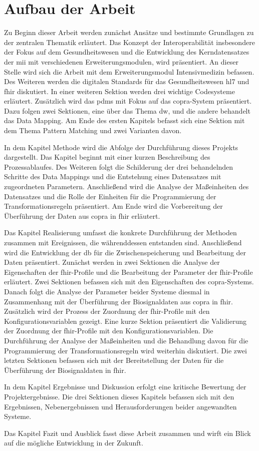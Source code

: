 \section{Aufbau der Arbeit} \label{sec:structure}

Zu Beginn dieser Arbeit werden zunächst Ansätze und bestimmte Grundlagen zu der zentralen Thematik erläutert. Das Konzept der Interoperabilität insbesondere der Fokus auf dem Gesundheitswesen und die Entwicklung des Kerndatensatzes der \ac{mii} mit verschiedenen Erweiterungsmodulen, wird präsentiert. An dieser Stelle wird sich die Arbeit mit dem Erweiterungsmodul Intensivmedizin befassen. Des Weiteren werden die digitalen Standards für das Gesundheitswesen \ac{hl7} und \ac{fhir} diskutiert. In einer weiteren Sektion werden drei wichtige Codesysteme erläutert. Zusätzlich wird das \ac{pdms} mit Fokus auf das \ac{copra}-System präsentiert. Dazu folgen zwei Sektionen, eine über das Thema \ac{dw}, und die andere behandelt das Data Mapping. Am Ende des ersten Kapitels befasst sich eine Sektion mit dem Thema Pattern Matching und zwei Varianten davon.

In dem Kapitel \glqq Methode\grqq{} wird die Abfolge der Durchführung dieses Projekts dargestellt. Das Kapitel beginnt mit einer kurzen Beschreibung des Prozessablaufes. Des Weiteren folgt die Schilderung der drei behandelnden Schritte des Data Mappings und die Entstehung eines Datensatzes mit zugeordneten Parametern. Anschließend wird die Analyse der Maßeinheiten des Datensatzes und die Rolle der Einheiten für die Programmierung der Transformationsregeln präsentiert. Am Ende wird die Vorbereitung der Überführung der Daten aus \ac{copra} in \ac{fhir} erläutert.

Das Kapitel \glqq Realisierung\grqq{} umfasst die konkrete Durchführung der Methoden zusammen mit Ereignissen, die währenddessen entstanden sind. Anschließend wird die Entwicklung der \ac{db} für die Zwischenspeicherung und Bearbeitung der Daten präsentiert. Zunächst werden in zwei Sektionen die Analyse der Eigenschaften der \ac{fhir}-Profile und die Bearbeitung der Parameter der \ac{fhir}-Profile erläutert. Zwei Sektionen befassen sich mit den Eigenschaften des \ac{copra}-Systems. Danach folgt die Analyse der Parameter beider Systeme diesmal in Zusammenhang mit der Überführung der Biosignaldaten aus \ac{copra} in \ac{fhir}. Zusätzlich wird der Prozess der Zuordnung der \ac{fhir}-Profile mit den Konfigurationsvariablen gezeigt. Eine kurze Sektion präsentiert die Validierung der Zuordnung der \ac{fhir}-Profile mit den Konfigurationsvariablen. Die Durchführung der Analyse der Maßeinheiten und die Behandlung davon für die Programmierung der Transformationsregeln wird weiterhin diskutiert. Die zwei letzten Sektionen befassen sich mit der Bereitstellung der Daten für die Überführung der Biosignaldaten in \ac{fhir}.

In dem Kapitel \glqq Ergebnisse und Diskussion\grqq{} erfolgt eine kritische Bewertung der Projektergebnisse. Die drei Sektionen dieses Kapitels befassen sich mit den Ergebnissen, Nebenergebnissen und Herausforderungen beider angewandten Systeme.

Das Kapitel \glqq Fazit und Ausblick\grqq{} fasst diese Arbeit zusammen und wirft ein Blick auf die mögliche Entwicklung in der Zukunft.